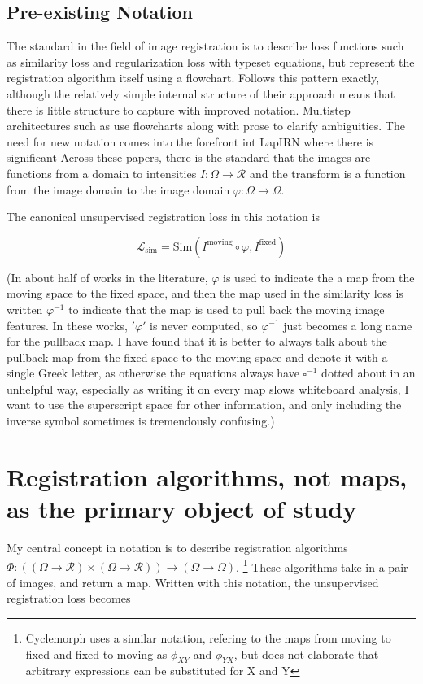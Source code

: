 \documentclass{article}
\begin{document}
\subsection{Pre-existing Notation}
The standard in the field of image registration is to describe loss functions
such as similarity loss and regularization loss with typeset equations, but
represent the registration algorithm itself using a flowchart.
\cite{balakrishnan2019voxelmorph} Follows this pattern exactly, although the
relatively simple internal structure of their approach means that there is
little structure to capture with improved notation. Multistep architectures
such as \cite{shen2019networks, mok2020large} use flowcharts along with prose
to clarify ambiguities. The need for new notation comes into the forefront int
LapIRN \cite{mok2020large} where there is significant Across these papers,
there is the standard that the images are functions from a domain to
intensities $I: \Omega \rightarrow \mathcal{R}$ and the transform is a function
from the image domain to the image domain $\varphi: \Omega \rightarrow \Omega$.

The canonical unsupervised registration loss in this notation is

$$\mathcal{L}_\text{sim} = \text{Sim}(I^\text{moving} \circ  \varphi , I^\text{fixed}) $$

(In about half of works in the literature, $\varphi$ is used to indicate the a map from the moving space to the fixed space, and then the map used in the similarity loss is written $\varphi^{-1}$ to indicate that the map is used to pull back the moving image features. In these works, $'\varphi'$ is never computed, so $\varphi^{-1}$ just becomes a long name for the pullback map. I have found that it is better to always talk about the pullback map from the fixed space to the moving space and denote it with a single Greek letter, as otherwise the equations always have $\square^{-1}$ dotted about in an unhelpful way, especially as writing it on every map slows whiteboard analysis, I want to use the superscript space for other information, and only including the inverse symbol sometimes is tremendously confusing.)

\section{Registration algorithms, not maps, as the primary object of study}

My central concept in notation is to describe registration algorithms $\Phi:
	\left( (\Omega \rightarrow \mathcal{R}) \times (\Omega \rightarrow \mathcal{R})
	\right) \rightarrow (\Omega \rightarrow \Omega) $. \footnote{Cyclemorph
	\cite{cyclemorph} uses a similar notation, refering to the maps from moving to
	fixed and fixed to moving as $\phi_{XY}$ and $\phi_{YX}$, but does not
	elaborate that arbitrary expressions can be substituted for X and Y} These
algorithms take in a pair of images, and return a map. Written with this
notation, the unsupervised registration loss becomes
\end{document}
